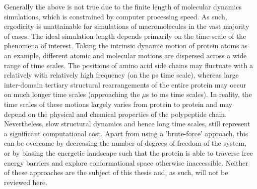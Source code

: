Generally the above is not true due to the finite length of molecular dynamics simulations, which is constrained by computer processing speed. As such, ergodicity is unattainable for simulations of macromolecules in the vast majority of cases. The ideal simulation length depends primarily on the time-scale of the phenomena of interest. Taking the intrinsic dynamic motion of protein atoms as an example, different atomic and molecular motions are dispersed across a wide range of time scales. The positions of amino acid side chains may fluctuate with a relatively with relatively high frequency (on the ps time scale), whereas large inter-domain tertiary structural rearrangements of the entire protein may occur on much longer time scales (approaching the $\mu$s to ms time scales). In reality, the time scales of these motions largely varies from protein to protein and may depend on the physical and chemical properties of the polypeptide chain. Nevertheless, slow structural dynamics and hence long time scales, still represent a significant computational cost. Apart from using a 'brute-force' approach, this can be overcome by decreasing the number of degrees of freedom of the system, or by biasing the energetic landscape such that the protein is able to traverse free energy barriers and explore conformational space otherwise inaccessible. Neither of these approaches are the subject of this thesis and, as such, will not be reviewed here.


